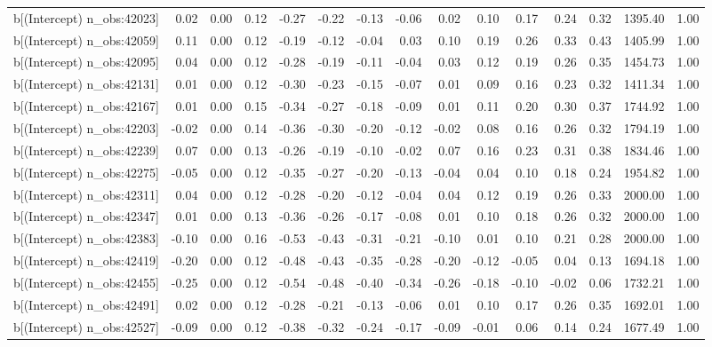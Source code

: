 \begin{table}[ht]
\begin{tabular}{rrrrrrrrrrrrrrr}
  b[(Intercept) n\_obs:42023] & 0.02 & 0.00 & 0.12 & -0.27 & -0.22 & -0.13 & -0.06 & 0.02 & 0.10 & 0.17 & 0.24 & 0.32 & 1395.40 & 1.00 \\ 
  b[(Intercept) n\_obs:42059] & 0.11 & 0.00 & 0.12 & -0.19 & -0.12 & -0.04 & 0.03 & 0.10 & 0.19 & 0.26 & 0.33 & 0.43 & 1405.99 & 1.00 \\ 
  b[(Intercept) n\_obs:42095] & 0.04 & 0.00 & 0.12 & -0.28 & -0.19 & -0.11 & -0.04 & 0.03 & 0.12 & 0.19 & 0.26 & 0.35 & 1454.73 & 1.00 \\ 
  b[(Intercept) n\_obs:42131] & 0.01 & 0.00 & 0.12 & -0.30 & -0.23 & -0.15 & -0.07 & 0.01 & 0.09 & 0.16 & 0.23 & 0.32 & 1411.34 & 1.00 \\ 
  b[(Intercept) n\_obs:42167] & 0.01 & 0.00 & 0.15 & -0.34 & -0.27 & -0.18 & -0.09 & 0.01 & 0.11 & 0.20 & 0.30 & 0.37 & 1744.92 & 1.00 \\ 
  b[(Intercept) n\_obs:42203] & -0.02 & 0.00 & 0.14 & -0.36 & -0.30 & -0.20 & -0.12 & -0.02 & 0.08 & 0.16 & 0.26 & 0.32 & 1794.19 & 1.00 \\ 
  b[(Intercept) n\_obs:42239] & 0.07 & 0.00 & 0.13 & -0.26 & -0.19 & -0.10 & -0.02 & 0.07 & 0.16 & 0.23 & 0.31 & 0.38 & 1834.46 & 1.00 \\ 
  b[(Intercept) n\_obs:42275] & -0.05 & 0.00 & 0.12 & -0.35 & -0.27 & -0.20 & -0.13 & -0.04 & 0.04 & 0.10 & 0.18 & 0.24 & 1954.82 & 1.00 \\ 
  b[(Intercept) n\_obs:42311] & 0.04 & 0.00 & 0.12 & -0.28 & -0.20 & -0.12 & -0.04 & 0.04 & 0.12 & 0.19 & 0.26 & 0.33 & 2000.00 & 1.00 \\ 
  b[(Intercept) n\_obs:42347] & 0.01 & 0.00 & 0.13 & -0.36 & -0.26 & -0.17 & -0.08 & 0.01 & 0.10 & 0.18 & 0.26 & 0.32 & 2000.00 & 1.00 \\ 
  b[(Intercept) n\_obs:42383] & -0.10 & 0.00 & 0.16 & -0.53 & -0.43 & -0.31 & -0.21 & -0.10 & 0.01 & 0.10 & 0.21 & 0.28 & 2000.00 & 1.00 \\ 
  b[(Intercept) n\_obs:42419] & -0.20 & 0.00 & 0.12 & -0.48 & -0.43 & -0.35 & -0.28 & -0.20 & -0.12 & -0.05 & 0.04 & 0.13 & 1694.18 & 1.00 \\ 
  b[(Intercept) n\_obs:42455] & -0.25 & 0.00 & 0.12 & -0.54 & -0.48 & -0.40 & -0.34 & -0.26 & -0.18 & -0.10 & -0.02 & 0.06 & 1732.21 & 1.00 \\ 
  b[(Intercept) n\_obs:42491] & 0.02 & 0.00 & 0.12 & -0.28 & -0.21 & -0.13 & -0.06 & 0.01 & 0.10 & 0.17 & 0.26 & 0.35 & 1692.01 & 1.00 \\ 
  b[(Intercept) n\_obs:42527] & -0.09 & 0.00 & 0.12 & -0.38 & -0.32 & -0.24 & -0.17 & -0.09 & -0.01 & 0.06 & 0.14 & 0.24 & 1677.49 & 1.00 \\ 

\end{tabular}
\end{table}
